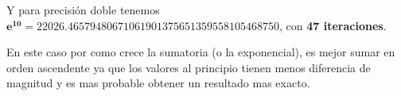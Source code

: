 \documentclass{article}
\begin{document}
Y para precisión doble tenemos $\boldsymbol{e^{10} = 22026.46579480671061901375651359558105468750}$,
con \textbf{47 iteraciones}.

En este caso por como crece la sumatoria (o la exponencial), es mejor sumar
en orden ascendente ya que los valores al principio tienen menos diferencia de magnitud y es mas probable
obtener un resultado mas exacto.






\end{document}
